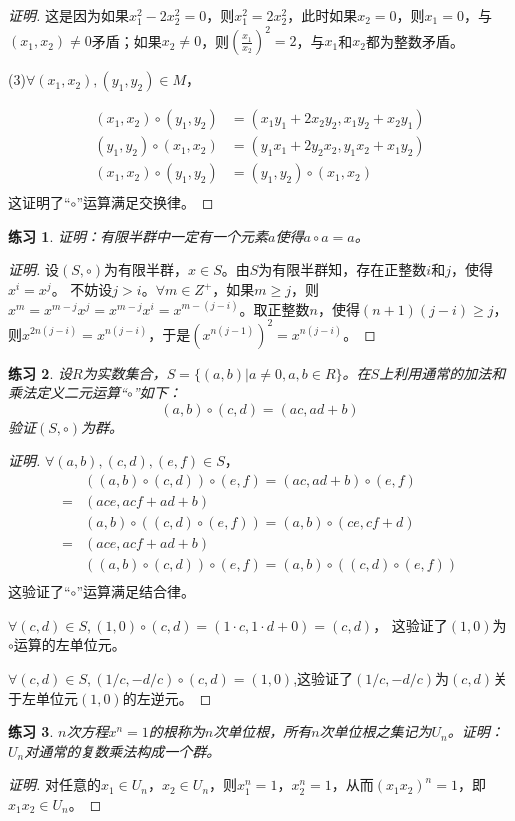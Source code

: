 \documentclass{article}
\newtheorem{Exercise}{练习}
\begin{document}
\begin{CJK*}{UTF8}{gbsn}
\begin{proof}[证明]
这是因为如果$x_1^2-2x_2^2=0$，则$x_1^2=2x_2^2$，此时如果$x_2=0$，则$x_1=0$，与$(x_1,x_2)\neq 0$矛盾；如果$x_2\neq 0$，则$(\frac{x_1}{x_2})^2=2$，与$x_1$和$x_2$都为整数矛盾。

(3)$\forall (x_1,x_2), (y_1,y_2)\in M$，

\begin{align*}
  (x_1,x_2)\circ (y_1,y_2) &= (x_1y_1+2x_2y_2,x_1y_2+x_2y_1)\\
  (y_1,y_2)\circ (x_1,x_2) &= (y_1x_1+2y_2x_2,y_1x_2+x_1y_2)\\
  (x_1,x_2)\circ (y_1,y_2) &= (y_1,y_2)\circ (x_1,x_2)\\
\end{align*}
这证明了“$\circ$”运算满足交换律。
\end{proof}

\begin{Exercise}
  证明：有限半群中一定有一个元素$a$使得$a\circ a=a$。
\end{Exercise}

\begin{proof}[证明]
  设$(S,\circ)$为有限半群，$x\in S$。由$S$为有限半群知，存在正整数$i$和$j$，使得$x^i=x^j$。
  不妨设$j>i$。$\forall m\in Z^+$，如果$m\geq j$，则$x^m=x^{m-j}x^j=x^{m-j}x^i=x^{m-(j-i)}$。取正整数$n$，使得$(n+1)(j-i)\geq j$，则$x^{2n(j-i)}=x^{n(j-i)}$，于是$(x^{n(j-1)})^2=x^{n(j-i)}$。
\end{proof}
\begin{Exercise}
  设$R$为实数集合，$S=\{(a,b)|a\neq 0,a,b\in R\}$。在$S$上利用通常的加法和乘法定义二元运算“$\circ$”如下：
  \[(a,b)\circ (c,d) = (ac, ad + b)\]
  验证$(S,\circ)$为群。
\end{Exercise}
\begin{proof}[证明]
  $\forall (a,b),(c,d),(e,f)\in S$，
  \begin{align*}
    &((a,b)\circ (c,d))\circ (e,f) = (ac,ad+b)\circ (e,f)\\
    =&(ace,acf+ad+b)\\
    &(a,b)\circ ((c,d)\circ (e,f)) = (a,b)\circ (ce,cf+d)\\
    =&(ace,acf+ad+b)\\
    &((a,b)\circ (c,d))\circ (e,f) = (a,b)\circ ((c,d)\circ (e,f))\\
  \end{align*}
  这验证了“$\circ$”运算满足结合律。

  $\forall (c,d)\in S, (1,0)\circ (c,d) = (1\cdot c, 1\cdot d + 0) = (c,d)$，
这验证了$(1,0)$为$\circ$运算的左单位元。

$\forall (c,d)\in S,(1/c,-d/c)\circ (c,d) = (1,0)$,这验证了$(1/c,-d/c)$为$(c,d)$关于左单位元$(1,0)$的左逆元。
\end{proof}
\begin{Exercise}
  $n$次方程$x^n=1$的根称为$n$次单位根，所有$n$次单位根之集记为$U_n$。证明：$U_n$对通常的复数乘法构成一个群。
\end{Exercise}
\begin{proof}[证明]
  对任意的$x_1\in U_n$，$x_2\in U_n$，则$x^n_1=1$，$x_2^n=1$，从而$(x_1x_2)^n=1$，即$x_1x_2\in U_n$。


\end{proof}
\end{CJK*}
\end{document}
